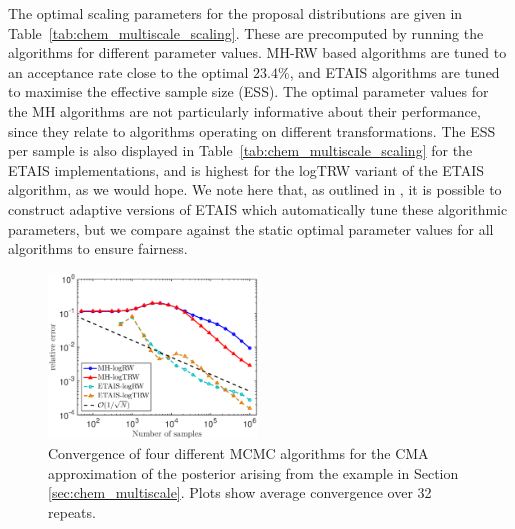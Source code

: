 \documentclass[final]{siamltex}
\newcommand{\edit}[1]{{\color{red} #1}}
\begin{document}
The optimal scaling parameters for the proposal distributions are
given in Table~\ref{tab:chem_multiscale_scaling}. These are
precomputed by running the algorithms for different parameter
values. MH-RW based algorithms are tuned to an acceptance rate close
to the optimal $23.4\%$, and ETAIS algorithms are tuned to maximise the
effective sample size (ESS). The optimal parameter values for the MH
algorithms are not particularly informative about their performance,
since they relate to algorithms operating on different
transformations. \edit{The ESS per sample is also displayed in
Table~\ref{tab:chem_multiscale_scaling} for the ETAIS implementations,
and is highest for the logTRW variant
of the ETAIS algorithm, as we would hope.} We note here that, as
outlined in \cite{cotter2015parallel}, it is possible to construct
adaptive versions of ETAIS which automatically tune these algorithmic
parameters, but we compare against the static optimal parameter values
for all algorithms to ensure fairness.

\begin{figure}[!htb]
\centering
\includegraphics[width=0.495\textwidth]{"images/Applications/CMA_L2_log_space"}
\caption{Convergence of four different MCMC algorithms for the CMA
  approximation of the  posterior arising from the example in Section
  \ref{sec:chem_multiscale}. \edit{Plots show average
    convergence over 32 repeats.}}
\label{fig:chem_multiscale_L2}
\end{figure}
\end{document}
